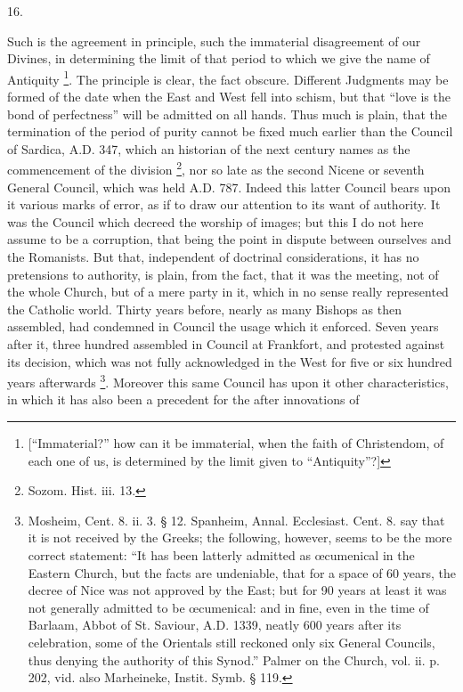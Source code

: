 16.

Such is the agreement in principle, such the immaterial
disagreement of our Divines, in determining the limit of that period
to which we give the name of Antiquity \footnote{[``Immaterial?'' how can it be
immaterial, when the faith of Christendom, of each one of us, is
determined by the limit given to ``Antiquity''?]}. The principle is clear, the fact obscure. Different Judgments
may be formed of the date when the East and West fell into schism, but
that ``love is the bond of perfectness'' will be admitted on
all hands. Thus much is plain, that the termination of the period of
purity cannot be fixed much earlier than the Council of Sardica, A.D.
347, which an historian of the next century names as the commencement
of the division \footnote{Sozom. Hist. iii. 13.}, nor
so late as the second Nicene or seventh General Council, which was
held A.D. 787. Indeed this latter Council bears upon it various marks
of error, as if to draw our attention to its want of authority. It was
the Council which decreed the worship of images; but this I do not
here assume to be a corruption, that being the point in dispute
between ourselves and the Romanists. But that, independent of
doctrinal considerations, it has no pretensions to authority, is
plain, from the fact, that it was the meeting, not of the whole
Church, but of a mere party in it, which in no sense really
represented the Catholic world. Thirty years before, nearly as many
Bishops as then assembled, had condemned in Council the usage which it
enforced. Seven years after it, three hundred assembled in Council at
Frankfort, and protested against its decision, which was not fully
acknowledged in the West for five or six hundred years afterwards \footnote{Mosheim, Cent. 8. ii. 3. § 12. Spanheim,
Annal. Ecclesiast. Cent. 8. say that it is not received by the Greeks;
the following, however, seems to be the more correct statement:
``It has been latterly admitted as œcumenical in the Eastern
Church, but the facts are undeniable, that for a space of 60 years,
the decree of Nice was not approved by the East; but for 90 years at
least it was not generally admitted to be œcumenical: and in fine,
even in the time of Barlaam, Abbot of St. Saviour, A.D. 1339, neatly
600 years after its celebration, some of the Orientals still reckoned
only six General Councils, thus denying the authority of this
Synod.'' Palmer on the Church, vol. ii. p. 202, vid. also
Marheineke, Instit. Symb. § 119.}. Moreover this same Council has upon it other characteristics,
in which it has also been a precedent for the after innovations of
